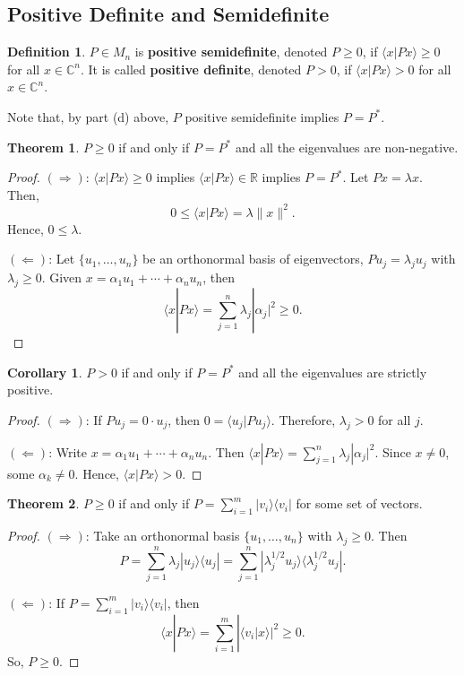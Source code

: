 \documentclass[12pt]{article}
\theoremstyle{definition}
\newtheorem*{theorem}{Theorem}
\newtheorem*{corollary}{Corollary}
\newtheorem*{definition}{Definition}
\newcommand{\braket}[2]{\langle #1|#2\rangle}
\newcommand{\ketbra}[2]{|#1\rangle\langle #2|}
\newcommand{\norm}[1]{\|#1\|}
\newcommand{\C}{\mathbb{C}}
\newcommand{\R}{\mathbb{R}}
\begin{document}
\subsection{Positive Definite and Semidefinite}

\begin{definition}
$P \in M_n$ is \textbf{positive semidefinite}, denoted $P \geq 0$, if $\braket{x}{Px} \geq 0$ for all $x \in \C^n$. It is called \textbf{positive definite}, denoted $P > 0$, if $\braket{x}{Px} > 0$ for all $x \in \C^n$.
\end{definition}

Note that, by part (d) above, $P$ positive semidefinite implies $P = P^*$.

\begin{theorem}
$P \geq 0$ if and only if $P = P^*$ and all the eigenvalues are non-negative.
\end{theorem}

\begin{proof}
$(\Rightarrow)$: $\braket{x}{Px} \geq 0$ implies $\braket{x}{Px} \in \R$ implies $P = P^*$. Let $Px = \lambda x$. Then,
\[
0 \leq \braket{x}{Px} = \lambda\norm{x}^2.
\]
Hence, $0 \leq \lambda$.

$(\Leftarrow)$: Let $\{u_1,\ldots,u_n\}$ be an orthonormal basis of eigenvectors, $Pu_j = \lambda_j u_j$ with $\lambda_j \geq 0$. Given $x = \alpha_1 u_1 + \cdots + \alpha_n u_n$, then
\[
\braket{x}{Px} = \sum_{j=1}^n \lambda_j |\alpha_j|^2 \geq 0.
\]
\end{proof}

\begin{corollary}
$P > 0$ if and only if $P = P^*$ and all the eigenvalues are strictly positive.
\end{corollary}

\begin{proof}
$(\Rightarrow)$: If $Pu_j = 0 \cdot u_j$, then $0 = \braket{u_j}{Pu_j}$. Therefore, $\lambda_j > 0$ for all $j$.

$(\Leftarrow)$: Write $x = \alpha_1 u_1 + \cdots + \alpha_n u_n$. Then $\braket{x}{Px} = \sum_{j=1}^n \lambda_j |\alpha_j|^2$. Since $x \neq 0$, some $\alpha_k \neq 0$. Hence, $\braket{x}{Px} > 0$.
\end{proof}

\begin{theorem}
$P \geq 0$ if and only if $P = \sum_{i=1}^m \ketbra{v_i}{v_i}$ for some set of vectors.
\end{theorem}

\begin{proof}
$(\Rightarrow)$: Take an orthonormal basis $\{u_1,\ldots,u_n\}$ with $\lambda_j \geq 0$. Then
\[
P = \sum_{j=1}^n \lambda_j \ketbra{u_j}{u_j} = \sum_{j=1}^n |\lambda_j^{1/2} u_j\rangle\langle\lambda_j^{1/2} u_j|.
\]

$(\Leftarrow)$: If $P = \sum_{i=1}^m \ketbra{v_i}{v_i}$, then
\[
\braket{x}{Px} = \sum_{i=1}^m |\braket{v_i}{x}|^2 \geq 0.
\]
So, $P \geq 0$.
\end{proof}
\end{document}
